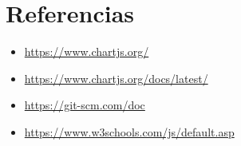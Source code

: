 \documentclass{article}
\begin{document}
	\newpage
% 

    \section{Referencias}
    \begin{itemize}	
        \item \url{https://www.chartjs.org/}
        \item \url{https://www.chartjs.org/docs/latest/}
        \item \url{https://git-scm.com/doc}
        \item \url{https://www.w3schools.com/js/default.asp}
	\end{itemize}

 
%
%
%
			
\end{document}
